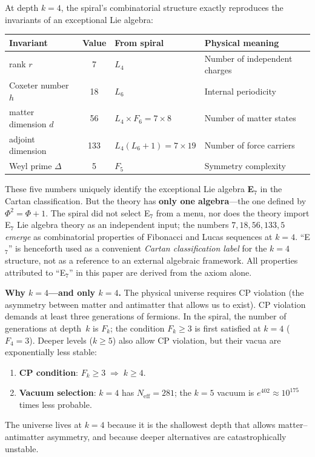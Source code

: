 \documentclass[12pt,a4paper]{article}
\begin{document}
At depth $k = 4$, the spiral's combinatorial structure exactly reproduces the invariants of an exceptional Lie algebra:
\begin{center}
\begin{tabular}{|l|c|l|l|}
\hline
\textbf{Invariant} & \textbf{Value} & \textbf{From spiral} & \textbf{Physical meaning} \\
\hline
rank $r$ & 7 & $L_4$ & Number of independent charges \\
Coxeter number $h$ & 18 & $L_6$ & Internal periodicity \\
matter dimension $d$ & 56 & $L_4 \times F_6 = 7 \times 8$ & Number of matter states \\
adjoint dimension & 133 & $L_4(L_6+1) = 7 \times 19$ & Number of force carriers \\
Weyl prime $\Delta$ & 5 & $F_5$ & Symmetry complexity \\
\hline
\end{tabular}
\end{center}
These five numbers uniquely identify the exceptional Lie algebra \textbf{E$_7$} in the Cartan classification.  But the theory has \textbf{only one algebra}---the one defined by $\Phi^2 = \Phi + 1$.  The spiral did not select E$_7$ from a menu, nor does the theory import E$_7$ Lie algebra theory as an independent input; the numbers $7, 18, 56, 133, 5$ \emph{emerge} as combinatorial properties of Fibonacci and Lucas sequences at $k = 4$.  ``E$_7$'' is henceforth used as a convenient \emph{Cartan classification label} for the $k = 4$ structure, not as a reference to an external algebraic framework.  All properties attributed to ``E$_7$'' in this paper are derived from the axiom alone.

\medskip
\noindent\textbf{Why $k = 4$---and only $k = 4$.}\;
The physical universe requires CP violation (the asymmetry between matter and antimatter that allows us to exist).  CP violation demands at least three generations of fermions.  In the spiral, the number of generations at depth~$k$ is $F_k$; the condition $F_k \geq 3$ is first satisfied at $k = 4$ ($F_4 = 3$).  Deeper levels ($k \geq 5$) also allow CP violation, but their vacua are exponentially less stable:
\begin{enumerate}[nosep]
\item \textbf{CP condition}: $F_k \geq 3 \;\Rightarrow\; k \geq 4$.
\item \textbf{Vacuum selection}: $k = 4$ has $N_{\mathrm{eff}} = 281$; the $k = 5$ vacuum is $e^{402} \approx 10^{175}$ times less probable.
\end{enumerate}
The universe lives at $k = 4$ because it is the shallowest depth that allows matter--antimatter asymmetry, and because deeper alternatives are catastrophically unstable.
\end{document}
